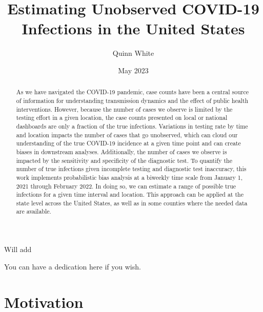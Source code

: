 \documentclass[12pt,twoside]{smiththesis}
\title{Estimating Unobserved COVID-19 Infections in the United States}
\author{Quinn White}
\date{May 2023}
\begin{document}
  \maketitle

\frontmatter %
\pagestyle{empty} %
  \begin{acknowledgements}
    Will add
  \end{acknowledgements}

  \hypersetup{linkcolor=black}
  \setcounter{tocdepth}{2}
  \tableofcontents

  \listoftables

  \listoffigures
  \begin{abstract}
    As we have navigated the COVID-19 pandemic, case counts have been a central source of information for understanding transmission dynamics and the effect of public health interventions. However, because the number of cases we observe is limited by the testing effort in a given location, the case counts presented on local or national dashboards are only a fraction of the true infections. Variations in testing rate by time and location impacts the number of cases that go unobserved, which can cloud our understanding of the true COVID-19 incidence at a given time point and can create biases in downstream analyses. Additionally, the number of cases we observe is impacted by the sensitivity and specificity of the diagnostic test. To quantify the number of true infections given incomplete testing and diagnostic test inaccuracy, this work implements probabilistic bias analysis at a biweekly time scale from January 1, 2021 through February 2022. In doing so, we can estimate a range of possible true infections for a given time interval and location. This approach can be applied at the state level across the United States, as well as in some counties where the needed data are available.
  \end{abstract}
  \begin{dedication}
    You can have a dedication here if you wish.
  \end{dedication}
\mainmatter %
\pagestyle{fancyplain} %

\hypertarget{motivation}{%
\chapter{Motivation}\label{motivation}}
\end{document}

